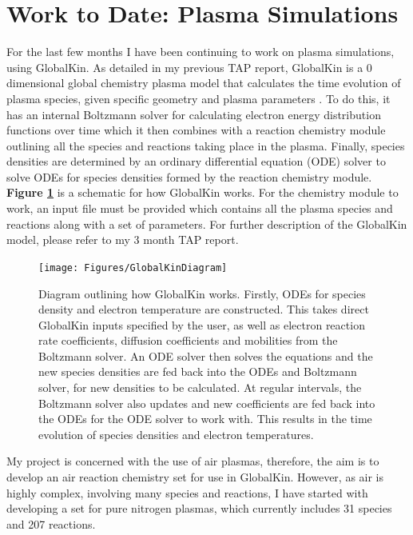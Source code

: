\documentclass[11pt, oneside]{article}   	%
\begin{document}
\section{Work to Date: Plasma Simulations}

For the last few months I have been continuing to work on plasma simulations, using GlobalKin.
As detailed in my previous TAP report, GlobalKin is a 0 dimensional global chemistry plasma model that calculates the time evolution of plasma species, given specific geometry and plasma parameters \cite{Stafford2004O2}.
To do this, it has an internal Boltzmann solver for calculating electron energy distribution functions over time which it then combines with a reaction chemistry module outlining all the species and reactions taking place in the plasma.
Finally, species densities are determined by an ordinary differential equation (ODE) solver to solve ODEs for species densities formed by the reaction chemistry module.
\textbf{Figure \ref{fig:GlobalKin}} is a schematic for how GlobalKin works.
For the chemistry module to work, an input file must be provided which contains all the plasma species and reactions along with a set of parameters.
For further description of the GlobalKin model, please refer to my 3 month TAP report.


\begin{figure}
\centering
\texttt{[image: Figures/GlobalKinDiagram]}
\caption{Diagram outlining how GlobalKin works. Firstly, ODEs for species density and electron temperature are constructed. This takes direct GlobalKin inputs specified by the user, as well as electron reaction rate coefficients, diffusion coefficients and mobilities from the Boltzmann solver. An ODE solver then solves the equations and the new species densities are fed back into the ODEs and Boltzmann solver, for new densities to be calculated. At regular intervals, the Boltzmann solver also updates and new coefficients are fed back into the ODEs for the ODE solver to work with. This results in the time evolution of species densities and electron temperatures.}
\label{fig:GlobalKin}
\end{figure}



My project is concerned with the use of air plasmas, therefore, the aim is to develop an air reaction chemistry set for use in GlobalKin.
However, as air is highly complex, involving many species and reactions, I have started with developing a set for pure nitrogen plasmas, which currently includes 31 species and 207 reactions.
\end{document}
